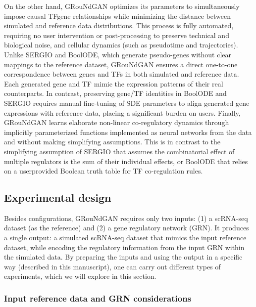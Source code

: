 On the other hand, GRouNdGAN optimizes its parameters to simultaneously impose causal TFgene relationships while minimizing the distance between simulated and reference data distributions. This process is fully automated, requiring no user intervention or post-processing
to preserve technical and biological noise, and cellular dynamics (such as pseudotime and
trajectories). Unlike SERGIO and BoolODE, which generate pseudo-genes without clear mappings
to the reference dataset, GRouNdGAN ensures a direct one-to-one correspondence between
genes and TFs in both simulated and reference data. Each generated gene and TF mimic the
expression patterns of their real counterparts. In contrast, preserving gene/TF identities in
BoolODE and SERGIO requires manual fine-tuning of SDE parameters to align generated gene
expressions with reference data, placing a significant burden on users. Finally, GRouNdGAN
learns elaborate non-linear co-regulatory dynamics through implicitly parameterized functions
implemented as neural networks from the data and without making simplifying assumptions.
This is in contrast to the simplifying assumption of SERGIO that assumes the combinatorial effect
of multiple regulators is the sum of their individual effects, or BoolODE that relies on a userprovided Boolean truth table for TF co-regulation rules.

\subsection*{Experimental design}

Besides configurations, GRouNdGAN requires only two inputs: (1) a scRNA-seq dataset (as the
reference) and (2) a gene regulatory network (GRN). It produces a single output: a simulated
scRNA-seq dataset that mimics the input reference dataset, while encoding the regulatory
information from the input GRN within the simulated data. By preparing the inputs and using the
output in a specific way (described in this manuscript), one can carry out different types of
experiments, which we will explore in this section. 

\subsubsection*{Input reference data and GRN considerations}

